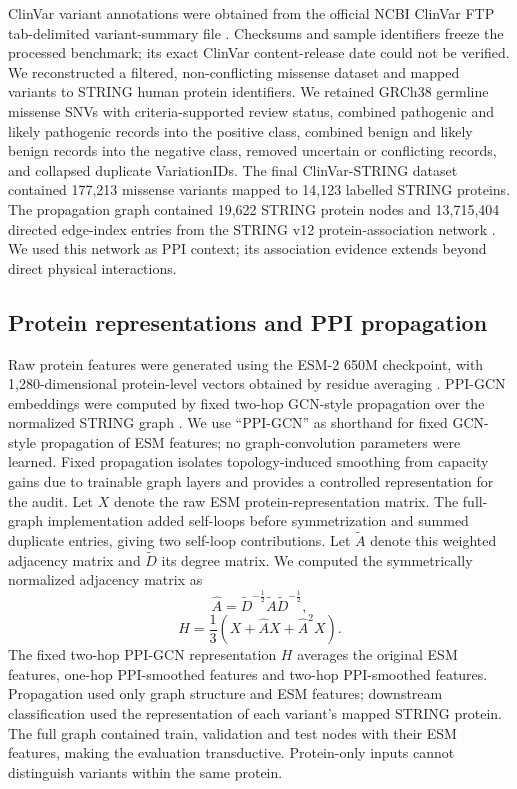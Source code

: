 \documentclass[conference]{IEEEtran}
\begin{document}
ClinVar variant annotations were obtained from the official NCBI ClinVar FTP tab-delimited variant-summary file \cite{Landrum2020ClinVar}. Checksums and sample identifiers freeze the processed benchmark; its exact ClinVar content-release date could not be verified. We reconstructed a filtered, non-conflicting missense dataset and mapped variants to STRING human protein identifiers. We retained GRCh38 germline missense SNVs with criteria-supported review status, combined pathogenic and likely pathogenic records into the positive class, combined benign and likely benign records into the negative class, removed uncertain or conflicting records, and collapsed duplicate VariationIDs. The final ClinVar-STRING dataset contained 177,213 missense variants mapped to 14,123 labelled STRING proteins. The propagation graph contained 19,622 STRING protein nodes and 13,715,404 directed edge-index entries from the STRING v12 protein-association network \cite{Szklarczyk2023STRING}. We used this network as PPI context; its association evidence extends beyond direct physical interactions.

\subsection{Protein representations and PPI propagation}

Raw protein features were generated using the ESM-2 650M checkpoint, with 1,280-dimensional protein-level vectors obtained by residue averaging \cite{Lin2023ESM}. PPI-GCN embeddings were computed by fixed two-hop GCN-style propagation over the normalized STRING graph \cite{Kipf2017GCN}. We use ``PPI-GCN'' as shorthand for fixed GCN-style propagation of ESM features; no graph-convolution parameters were learned. Fixed propagation isolates topology-induced smoothing from capacity gains due to trainable graph layers and provides a controlled representation for the audit. Let $X$ denote the raw ESM protein-representation matrix. The full-graph implementation added self-loops before symmetrization and summed duplicate entries, giving two self-loop contributions. Let $\tilde{A}$ denote this weighted adjacency matrix and $\tilde{D}$ its degree matrix. We computed the symmetrically normalized adjacency matrix as
\begin{equation}
\hat{A}=\tilde{D}^{-\frac{1}{2}}\tilde{A}\tilde{D}^{-\frac{1}{2}},
\end{equation}
\begin{equation}
H=\frac{1}{3}\left(X+\hat{A}X+\hat{A}^{2}X\right).
\end{equation}
The fixed two-hop PPI-GCN representation $H$ averages the original ESM features, one-hop PPI-smoothed features and two-hop PPI-smoothed features. Propagation used only graph structure and ESM features; downstream classification used the representation of each variant's mapped STRING protein. The full graph contained train, validation and test nodes with their ESM features, making the evaluation transductive. Protein-only inputs cannot distinguish variants within the same protein.
\end{document}

